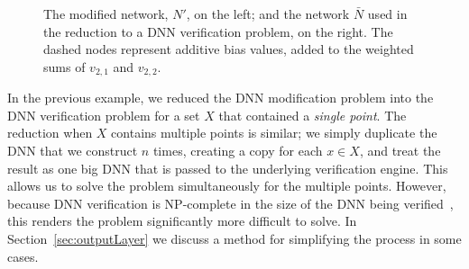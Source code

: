 \documentclass{easychair}
\begin{document}
\begin{figure}[htp]
\begin{subfigure}{0.5\linewidth}
  \end{subfigure}
  \caption{The modified network, $N'$, on the left; and the network
    $\bar{N}$ used in the reduction to a DNN verification problem, on
    the right. The dashed nodes represent additive bias values, added
    to the weighted sums of $v_{2,1}$ and $v_{2,2}$.}
    \label{fig:changeJustOneLayer}
\end{figure}

In the previous example, we reduced the DNN modification problem into
the DNN verification problem for a set $X$ that contained a
\emph{single point}. The reduction when $X$ contains multiple points
is similar; we simply duplicate the DNN that we construct $n$ times, creating a
copy for each $x\in X$, and treat the result as one big DNN that is
passed to the underlying verification engine. This allows us to solve the problem
simultaneously for the multiple points. However, because DNN
verification is NP-complete in the size of the DNN being
verified~\cite{KaBaDiJuKo17Reluplex}, this renders the problem
significantly more difficult to solve. In
Section~\ref{sec:outputLayer} we discuss a method for
simplifying the process in some cases.
\end{document}
